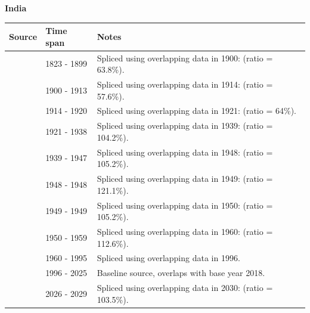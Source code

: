 \documentclass[12pt,a4paper,landscape]{article}
\begin{document}
\begin{adjustbox}{max totalsize={\paperwidth}{\paperheight},center}
\begin{minipage}[t][\textheight][t]{\textwidth}
\vspace*{0.5cm}
{}
\begin{center}
{\Large\bfseries India}
\end{center}
\vspace{0.5cm}
\begin{table}[H]
\centering
\small
\begin{tabular}{|l|l|l|}
\hline
\textbf{Source} & \textbf{Time span} & \textbf{Notes} \\
\hline
\rowcolor{white}\cite{Tena}& 1823 - 1899 &Spliced using overlapping data in 1900: (ratio = 63.8\%).\\
\rowcolor{lightgray}\cite{UN_trade}& 1900 - 1913 &Spliced using overlapping data in 1914: (ratio = 57.6\%).\\
\rowcolor{white}\cite{Tena}& 1914 - 1920 &Spliced using overlapping data in 1921: (ratio = 64\%).\\
\rowcolor{lightgray}\cite{UN_trade}& 1921 - 1938 &Spliced using overlapping data in 1939: (ratio = 104.2\%).\\
\rowcolor{white}\cite{Mitchell}& 1939 - 1947 &Spliced using overlapping data in 1948: (ratio = 105.2\%).\\
\rowcolor{lightgray}\cite{UN_trade}& 1948 - 1948 &Spliced using overlapping data in 1949: (ratio = 121.1\%).\\
\rowcolor{white}\cite{Mitchell}& 1949 - 1949 &Spliced using overlapping data in 1950: (ratio = 105.2\%).\\
\rowcolor{lightgray}\cite{UN_trade}& 1950 - 1959 &Spliced using overlapping data in 1960: (ratio = 112.6\%).\\
\rowcolor{white}\cite{WDI}& 1960 - 1995 &Spliced using overlapping data in 1996.\\
\rowcolor{lightgray}\cite{OECD_EO}& 1996 - 2025 &Baseline source, overlaps with base year 2018.\\
\rowcolor{white}\cite{IMF_WEO_forecast}& 2026 - 2029 &Spliced using overlapping data in 2030: (ratio = 103.5\%).\\
\hline
\end{tabular}
\end{table}
\begin{figure}[H]
\centering

\end{figure}
\end{minipage}
\end{adjustbox}
\end{document}
